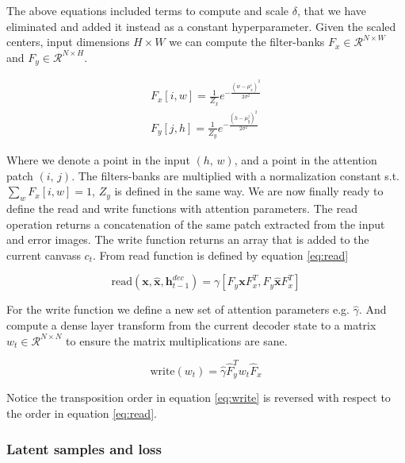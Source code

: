 \noindent The above equations included terms to compute and scale $\delta$, that we have eliminated and added it instead as a constant hyperparameter. Given the scaled centers, input dimensions $H \times W$ we can compute the filter-banks $F_x \in \mathcal{R}^{N \times W}$ and $F_y \in \mathcal{R}^{N \times H}$. 

\begin{align}
F_x [i, w] = \frac{1}{Z_x}e^{-\frac{(w - \mu_x^i)^2}{2\sigma^2}} \\
F_y [j, h] = \frac{1}{Z_y}e^{-\frac{(h - \mu_y^j)^2}{2\sigma^2}}
\end{align}

\noindent Where we denote a point in the input $(h,\, w)$, and a point in the attention patch $(i,\, j)$. The filters-banks are multiplied with a normalization constant s.t. $\sum_w F_x[i, w] = 1$, $Z_y$ is defined in the same way. We are now finally ready to define the read and write functions with attention parameters. The read operation returns a concatenation of the same patch extracted from the input and error images. The write function returns an array that is added to the current canvass $c_t$. From \citet{Gregor2015} read function is defined by equation \ref{eq:read}

\begin{equation}\label{eq:read}
\text{read}(\mathbf{x}, \mathbf{\hat{x}}, \mathbf{h}_{t-1}^{dec}) = \gamma[F_y \mathbf{x} F_x^T, F_y \mathbf{\hat{x}} F_x^T]
\end{equation} 

\noindent For the write function we define a new set of attention parameters e.g. $\hat{\gamma}$. And compute a dense layer transform from the current decoder state to a matrix $w_t \in \mathcal{R}^{N \times N}$ to ensure the matrix multiplications are sane. 

\begin{equation}\label{eq:write}
\text{write}(w_t)  = \hat{\gamma} \hat{F}^T_y w_t \hat{F}_x
\end{equation}

\noindent Notice the transposition order in equation \ref{eq:write} is reversed with respect to the order in equation \ref{eq:read}. 

\subsubsection{Latent samples and loss}


